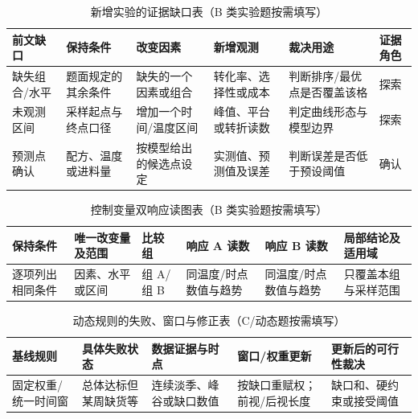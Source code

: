 \documentclass[withoutpreface,bwprint]{cumcmthesis}
\newif\ifmcmguidance
\begin{document}
\ifmcmguidance
  \begin{table}[H]
    \centering
    \small
    \caption{新增实验的证据缺口表（B 类实验题按需填写）}
    \label{tab:evidence-gap-experiments-guide}
    \begin{tabular}{p{1.75cm}p{2.05cm}p{2.1cm}p{2.0cm}p{2.15cm}p{1.55cm}}
      \toprule
      前文缺口 & 保持条件 & 改变因素 & 新增观测 & 裁决用途 & 证据角色 \\
      \midrule
      缺失组合/水平 & 题面规定的其余条件 & 缺失的一个因素或组合 & 转化率、选择性或成本 & 判断排序/最优点是否覆盖该格 & 探索 \\
      未观测区间 & 采样起点与终点口径 & 增加一个时间/温度区间 & 峰值、平台或转折读数 & 判定曲线形态与模型边界 & 探索 \\
      预测点确认 & 配方、温度或进料量 & 按模型给出的候选点设定 & 实测值、预测值及误差 & 判断误差是否低于预设阈值 & 确认 \\
      \bottomrule
    \end{tabular}
  \end{table}
  \begin{table}[H]
    \centering
    \small
    \caption{控制变量双响应读图表（B 类实验题按需填写）}
    \label{tab:controlled-dual-response-guide}
    \begin{tabular}{p{1.9cm}p{2.2cm}p{1.8cm}p{2.1cm}p{2.1cm}p{2.3cm}}
      \toprule
      保持条件 & 唯一改变量及范围 & 比较组 & 响应 A 读数 & 响应 B 读数 & 局部结论及适用域 \\
      \midrule
      逐项列出相同条件 & 因素、水平或区间 & 组 A/组 B & 同温度/时点数值与趋势 & 同温度/时点数值与趋势 & 只覆盖本组与采样范围 \\
      \bottomrule
    \end{tabular}
  \end{table}
  \begin{table}[H]
    \centering
    \small
    \caption{动态规则的失败、窗口与修正表（C/动态题按需填写）}
    \label{tab:dynamic-rule-revision-guide}
    \begin{tabular}{p{2.15cm}p{2.55cm}p{2.35cm}p{2.2cm}p{3.2cm}}
      \toprule
      基线规则 & 具体失败状态 & 数据证据与时点 & 窗口/权重更新 & 更新后的可行性裁决 \\
      \midrule
      固定权重/统一时间窗 & 总体达标但某周缺货等 & 连续淡季、峰谷或缺口数值 & 按缺口重赋权；前视/后视长度 & 缺口和、硬约束或接受阈值 \\
      \bottomrule
    \end{tabular}
  \end{table}
\end{document}
